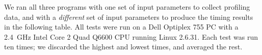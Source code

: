 We ran all three programs
with one set of input parameters to collect profiling data,
and with a \emph{different} set of input parameters to produce
the timing results in the following table.
All tests were run on
a Dell Optiplex 755 PC with a 2.4~GHz Intel Core 2 Quad Q6600 CPU
running Linux 2.6.31.
Each test was run ten times;
we discarded the highest and lowest times, and averaged the rest.


